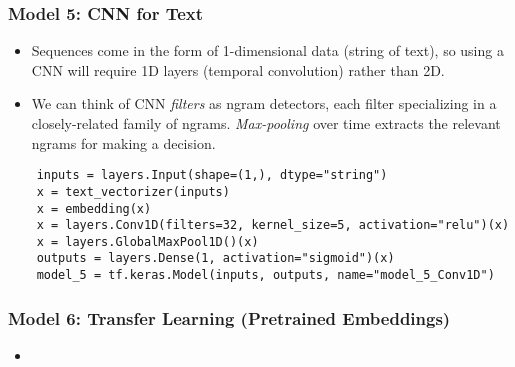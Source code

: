 \documentclass[11pt, a4paper]{article}
\begin{document}
	\subsubsection{Model 5: CNN for Text}
	\begin{itemize}
		\item Sequences come in the form of 1-dimensional data (string of text), so using a CNN will require 1D layers (temporal convolution) rather than 2D.
		\item We can think of CNN \textit{filters} as ngram detectors, each filter specializing in a closely-related family of ngrams.\textit{ Max-pooling} over time extracts the relevant ngrams for making a decision.
	\end{itemize}
	\begin{lstlisting}
	inputs = layers.Input(shape=(1,), dtype="string")
	x = text_vectorizer(inputs)
	x = embedding(x)
	x = layers.Conv1D(filters=32, kernel_size=5, activation="relu")(x)
	x = layers.GlobalMaxPool1D()(x)
	outputs = layers.Dense(1, activation="sigmoid")(x)
	model_5 = tf.keras.Model(inputs, outputs, name="model_5_Conv1D")\end{lstlisting} \newpage


	\subsubsection{Model 6: Transfer Learning (Pretrained Embeddings)}
	\begin{itemize}
		\item 
	\end{itemize}
	
	
	
	
	
	
\end{document}
